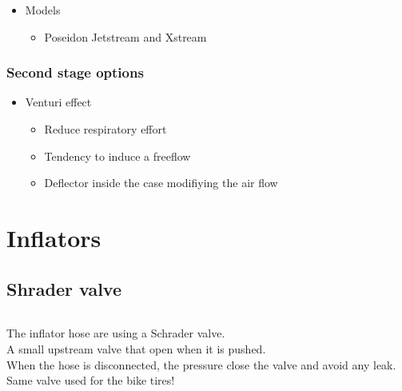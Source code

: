 \documentclass[aspectratio=1610,english,12pt]{beamer}
\begin{document}
\begin{frame}{\insertsubsubsection}
	\begin{itemize}
		\item Models
		\begin{itemize}
			\item Poseidon Jetstream and Xstream
		\end{itemize}
	\end{itemize}
\end{frame}

\subsubsection{Second stage options}
\begin{frame}{\insertsubsubsection}
	\begin{itemize}
		\item Venturi effect
		\begin{itemize}
			\item Reduce respiratory effort
			\item Tendency to induce a freeflow
			\item Deflector inside the case modifiying the air flow
		\end{itemize}
	\end{itemize}
\end{frame}

\section{Inflators}

\subsection{Shrader valve}
\begin{frame}{\insertsubsection}
	\begin{columns}[onlytextwidth]
			The inflator hose are using a Schrader valve.\\
			A small upstream valve that open when it is pushed.\\
			When the hose is disconnected, the pressure close the valve and avoid any leak.\\
			Same valve used for the bike tires!
	\end{columns}
\end{frame}
\end{document}
